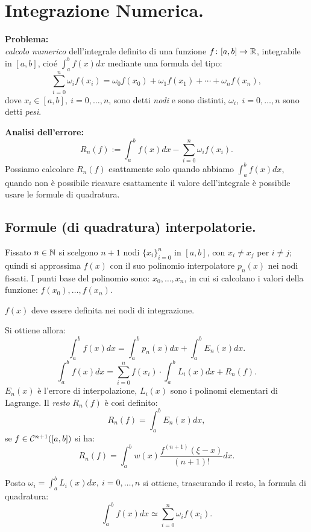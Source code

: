 
\chapter{Integrazione Numerica.}
\textbf{Problema:}\\ \emph{calcolo numerico} dell'integrale definito di una
funzione $f \colon [a,b] \to \mathbb{R}$, integrabile in $[a,b]$,  cioé $\int_a^b
f(x)dx$ mediante una formula del tipo:
\[\sum_{i=0}^n\omega_if(x_i) = \omega_0f(x_0)+ \omega_1f(x_1)+ \cdots 
+ \omega_nf(x_n),\]
dove $x_i \in [a,b], \ i = 0, \ldots, n$, sono detti \emph{nodi} e sono 
distinti, $\omega_i, \ i=0, \ldots, n$ sono detti \emph{pesi}.
\begin{flushleft}
\textbf{Analisi dell'errore:}
\[R_n(f) := \int_a^bf(x)dx - \sum_{i=0}^n\omega_if(x_i).\]
Possiamo calcolare $R_n(f)$ esattamente solo quando abbiamo $\int_a^bf(x)dx$,
quando non è possibile ricavare esattamente il valore dell'integrale è
possibile usare le formule di quadratura.
\end{flushleft}

\section{Formule (di quadratura) interpolatorie.}
Fissato $n \in \mathbb{N}$ si scelgono $n+1$ nodi $\{x_i\}_{i=0}^n$ in $[a,b]$, con
$x_i \neq x_j$ per $i \neq j$; quindi si approssima $f(x)$ con il suo 
polinomio interpolatore $p_n(x)$ nei nodi fissati.
I punti base del polinomio sono: $x_0, \ldots, x_n$, in cui si calcolano i
valori della funzione: $f(x_0), \ldots, f(x_n)$.
\begin{osse}
$f(x)$ deve essere definita nei nodi di integrazione.
\end{osse}
Si ottiene allora:
\[\int_a^bf(x)dx = \int_a^bp_n(x)dx + \int_a^bE_n(x)dx.\]
\[\int_a^bf(x)dx = \sum_{i=0}^nf(x_i)\cdot \int_a^bL_i(x)dx + R_n(f).\]
$E_n(x)$ è l'errore di interpolazione, $L_i(x)$ sono i polinomi elementari di
Lagrange. Il \emph{resto} $R_n(f)$ è così definito:
\[R_n(f) = \int_a^bE_n(x)dx,\]
se $f \in \mathcal{C}^{n+1}([a,b])$ si ha:
\[R_n(f) = \int_a^bw(x)\frac{f^{(n+1)}(\xi-x)}{(n+1)!}
dx.\]

Posto $\omega_i = \int_a^bL_i(x)dx, \ i = 0, \ldots, n$ si ottiene, 
trascurando il resto, la formula di quadratura:
\begin{equation}\label{eq14.1}
\int_a^bf(x)dx \simeq \sum_{i=0}^n\omega_if(x_i).
\end{equation} 

